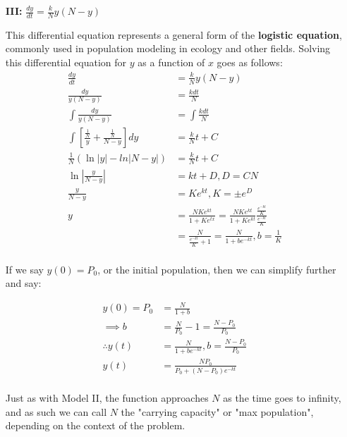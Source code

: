 \documentclass[12pt]{article}
\begin{document}
\begin{itemize}
    \item[\textbf{III:}] $\frac{dy}{dt} = \frac{k}{N}y(N-y)$
    
    This differential equation represents a general form of the \textbf{logistic equation}, commonly used in population modeling in ecology and other fields. Solving this differential equation for $y$ as a function of $x$ goes as follows:
    \begin{equation}
        \begin{split}
            \frac{dy}{dt} &= \frac{k}{N}y(N-y)\\
            \frac{dy}{y(N-y)} &= \frac{k dt}{N}\\
            \int \frac{dy}{y(N-y)} &= \int \frac{k dt}{N}\\
            \int [\frac{\frac{1}{N}}{y} + \frac{\frac{1}{N}}{N-y}] dy &= \frac{k}{N} t + C\\
            \frac{1}{N}(\ln|y| - ln|N-y|) &= \frac{k}{N} t + C\\
            \ln|\frac{y}{N-y}| &= kt + D, D = CN\\
            \frac{y}{N-y} &= Ke^{kt}, K = \pm e^D\\
            y &= \frac{NKe^{kt}}{1+Ke^{tx}} =\frac{NKe^{kt}}{1+Ke^{kt}} \frac{\frac{e^{-kt}}{K}}{\frac{e^{-kt}}{K}}\\
            &= \frac{N}{\frac{e^{-kt}}{K} + 1} = \frac{N}{1+be^{-kt}}, b = \frac{1}{K}\\
        \end{split}
    \end{equation}

    If we say $y(0) = P_0$, or the initial population, then we can simplify further and say:

    \begin{equation}
        \begin{split}
            y(0) = P_0 &= \frac{N}{1+b}\\
            \implies b &= \frac{N}{P_0} - 1 = \frac{N-P_0}{P_0}\\
            \therefore y(t) &= \frac{N}{1+be^{-kt}}, b = \frac{N-P_0}{P_0}\\
            y(t) &= \frac{NP_0}{P_0 + (N-P_0)e^{-kt}}\\
        \end{split}
    \end{equation}

    Just as with Model II, the function approaches $N$ as the time goes to infinity, and as such we can call $N$ the "carrying capacity" or "max population", depending on the context of the problem.


\end{itemize}
\end{document}
